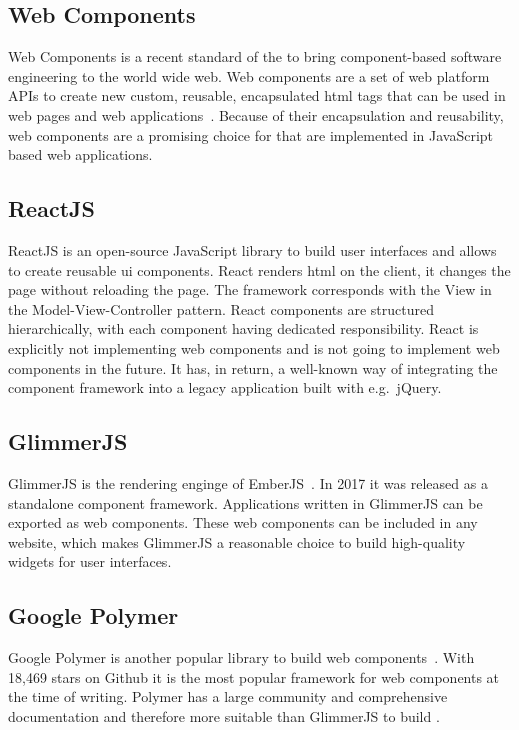 \subsection{Web Components}
Web Components is a recent standard of the \textcite{W3C2017} to bring component-based software engineering to the world wide web.
Web components are a set of web platform APIs to create new custom, reusable, encapsulated \gls{html} tags that can be used in web pages and web applications~\parencite{WebComponents2017}.
Because of their encapsulation and reusability, web components are a promising choice for \cmvs{} that are implemented in JavaScript based web applications.

\subsection{ReactJS}
ReactJS is an open-source JavaScript library to build user interfaces and allows to create reusable \gls{ui} components.
React renders \gls{html} on the client, it changes the page without reloading the page.
The framework corresponds with the View in the Model-View-Controller pattern.
React components are structured hierarchically, with each component having dedicated responsibility.
React is explicitly not implementing web components and is not going to implement web components in the future.
It has, in return, a well-known way of integrating the component framework into a legacy application built with e.g.\ jQuery.

\subsection{GlimmerJS} 
GlimmerJS is the rendering enginge of EmberJS~\parencite{Glimmer2017}.
In 2017 it was released as a standalone component framework.
Applications written in GlimmerJS can be exported as web components.
These web components can be included in any website, which makes GlimmerJS a reasonable choice to build high-quality widgets for user interfaces.

\subsection{Google Polymer}
Google Polymer is another popular library to build web components~\parencite{Polymer2017}.
With 18,469 stars on Github it is the most popular framework for web components at the time of writing.
Polymer has a large community and comprehensive documentation and therefore more suitable than GlimmerJS to build \cmvs{}.

